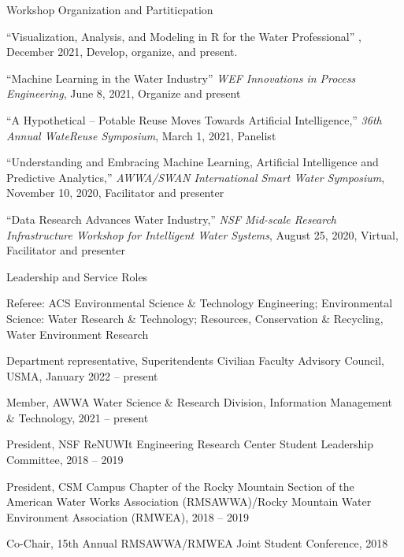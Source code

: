 \documentclass{resume} %
\begin{document}

\begin{rSection}{Workshop Organization and Partiticpation}

``Visualization, Analysis, and Modeling in R for the Water Professional'' , December 2021, Develop, organize, and present.

``Machine Learning in the Water Industry'' \emph{WEF Innovations in Process Engineering}, June 8, 2021, Organize and present

``A Hypothetical – Potable Reuse Moves Towards Artificial Intelligence,'' \emph{36th Annual WateReuse Symposium}, March 1, 2021, Panelist

``Understanding and Embracing Machine Learning, Artificial Intelligence and Predictive Analytics,'' \emph{AWWA/SWAN International Smart Water Symposium}, November 10, 2020, Facilitator and presenter

``Data Research Advances Water Industry,'' \emph{NSF Mid-scale Research Infrastructure Workshop for Intelligent Water Systems}, August 25, 2020, Virtual, Facilitator and presenter

\end{rSection}



\begin{rSection}{Leadership and Service Roles}

Referee: ACS Environmental Science \& Technology Engineering; Environmental Science: Water Research \& Technology; Resources, Conservation \& Recycling, Water Environment Research

Department representative, Superitendents Civilian Faculty Advisory Council, USMA, January 2022 – present

Member, AWWA Water Science \& Research Division, Information Management \& Technology, 2021 – present

President, NSF ReNUWIt Engineering Research Center Student Leadership Committee, 2018 – 2019

President, CSM Campus Chapter of the Rocky Mountain Section of the American Water Works Association (RMSAWWA)/Rocky Mountain Water Environment Association (RMWEA), 2018 – 2019

Co-Chair, 15th Annual RMSAWWA/RMWEA Joint Student Conference, 2018

\end{rSection}
\end{document}
